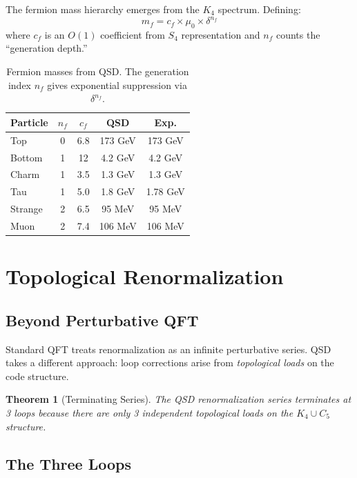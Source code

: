 \documentclass[11pt,a4paper]{article}
\newtheorem{theorem}{Theorem}[section]
\theoremstyle{definition}
\newcommand{\dgeo}{\delta}              %
\newcommand{\murad}{\mu_0}              %
\begin{document}
The fermion mass hierarchy emerges from the $K_4$ spectrum. Defining:
\begin{equation}
m_f = c_f \times \murad \times \dgeo^{n_f}
\end{equation}
where $c_f$ is an $O(1)$ coefficient from $S_4$ representation and $n_f$ counts the ``generation depth.''

\begin{table}[h]
\centering
\begin{tabular}{lcccc}
\toprule
\textbf{Particle} & \textbf{$n_f$} & \textbf{$c_f$} & \textbf{QSD} & \textbf{Exp.} \\
\midrule
Top & 0 & 6.8 & 173 GeV & 173 GeV \\
Bottom & 1 & 12 & 4.2 GeV & 4.2 GeV \\
Charm & 1 & 3.5 & 1.3 GeV & 1.3 GeV \\
Tau & 1 & 5.0 & 1.8 GeV & 1.78 GeV \\
Strange & 2 & 6.5 & 95 MeV & 95 MeV \\
Muon & 2 & 7.4 & 106 MeV & 106 MeV \\
\bottomrule
\end{tabular}
\caption{Fermion masses from QSD. The generation index $n_f$ gives exponential suppression via $\dgeo^{n_f}$.}
\label{tab:masses}
\end{table}

\section{Topological Renormalization}
\label{sec:rg}

\subsection{Beyond Perturbative QFT}

Standard QFT treats renormalization as an infinite perturbative series. QSD takes a different approach: loop corrections arise from \emph{topological loads} on the code structure.

\begin{theorem}[Terminating Series]
The QSD renormalization series terminates at 3 loops because there are only 3 independent topological loads on the $K_4 \cup C_5$ structure.
\end{theorem}

\subsection{The Three Loops}
\end{document}
